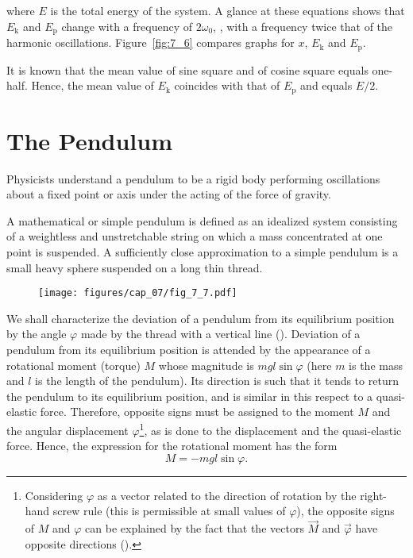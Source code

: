 \noindent
where $E$ is the total energy of the system. A glance at these equations shows that $E_{\text{k}}$ and $E_{\text{p}}$ change with a frequency of $2\omega_0$, \ie, with a frequency twice that of the harmonic oscillations. Figure~\ref{fig:7_6} compares graphs for $x$, $E_{\text{k}}$ and $E_{\text{p}}$.



It is known that the mean value of sine square and of cosine square equals one-half. Hence, the mean value of $E_{\text{k}}$ coincides with that of $E_{\text{p}}$ and equals $E/2$.

\section{The Pendulum}\label{sec:7_6}

Physicists understand a pendulum to be a rigid body performing oscillations about a fixed point or axis under the acting of the force of gravity.

A mathematical or simple pendulum is defined as an idealized system consisting of a weightless and unstretchable string on which a mass concentrated at one point is suspended. A sufficiently close approximation to a simple pendulum is a small heavy sphere suspended on a long thin thread.

\begin{figure}[t]
	\begin{center}
		\texttt{[image: figures/cap\_07/fig\_7\_7.pdf]}
		\caption[]{}
		\label{fig:7_7}
	\end{center}
	\vspace{-0.7cm}
\end{figure}

We shall characterize the deviation of a pendulum from its equilibrium position by the angle $\varphi$ made by the thread with a vertical line (). Deviation of a pendulum from its equilibrium position is attended by the appearance of a rotational moment (torque) $M$ whose magnitude is $mgl\sin\varphi$ (here $m$ is the mass and $l$ is the length of the pendulum). Its direction is such that it tends to return the pendulum to its equilibrium position, and is similar in this respect to a quasi-elastic force. Therefore, opposite signs must be assigned to the moment $M$ and the angular displacement $\varphi$\footnote{Considering $\varphi$ as a vector related to the direction of rotation by the right-hand screw rule (this is permissible at small values of $\varphi$), the opposite signs of	$M$ and $\varphi$ can be explained by the fact that the vectors $\vec{M}$ and $\vec{\varphi}$ have opposite	directions ().}, as is done to the displacement and the quasi-elastic force. Hence, the expression for the rotational moment has the form
\begin{equation}\label{eq:7_71}
	M = -mgl\sin\varphi.
\end{equation}

